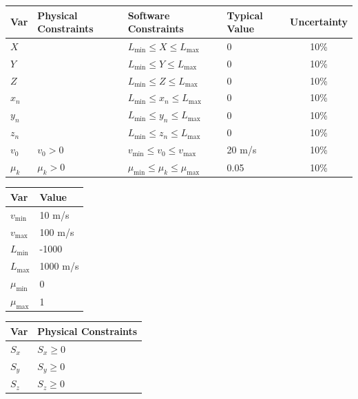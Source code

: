 \documentclass[12pt]{article}
\begin{document}
\begin{table}[!h]
  \caption{Input Variables} \label{TblInputVar}
  \renewcommand{\arraystretch}{1.2}
\noindent \begin{longtable*}{l l l l c} 
  \toprule
  \textbf{Var} & \textbf{Physical Constraints} & \textbf{Software Constraints} &
                             \textbf{Typical Value} & \textbf{Uncertainty}\\
  \midrule 
  $X$ &  & $L_{\text{min}} \leq X \leq L_{\text{max}}$ & 0 & 10\%
  \\
  $Y$ &  & $L_{\text{min}} \leq Y \leq L_{\text{max}}$ & 0 & 10\%
  \\
  $Z$ &  & $L_{\text{min}} \leq Z \leq L_{\text{max}}$ & 0 & 10\%
  \\
  $x_{n}$ &  & $L_{\text{min}} \leq x_{n} \leq L_{\text{max}}$ & 0 & 10\%
  \\
  $y_{n}$ &  & $L_{\text{min}} \leq y_{n} \leq L_{\text{max}}$ & 0 & 10\%
  \\
  $z_{n}$ &  & $L_{\text{min}} \leq z_{n} \leq L_{\text{max}}$ & 0 & 10\%
  \\
  $v_{0}$ & $v_{0} > 0$ & $v_{\text{min}} \leq v_{0} \leq v_{\text{max}}$ & 20 m/s & 10\%
  \\
  $\mu_{k}$ & $\mu_{k} > 0$ & $\mu_{\text{min}} \leq \mu_{k} \leq \mu_{\text{max}}$ & 0.05 & 10\%
  \\
  \bottomrule
\end{longtable*}
\end{table}

\noindent 

\begin{table}[!h]
\caption{Specification Parameter Values} \label{TblSpecParams}
\renewcommand{\arraystretch}{1.2}
\noindent \begin{longtable*}{l l} 
  \toprule
  \textbf{Var} & \textbf{Value} \\
  \midrule 
  $v_\text{min}$ & 10 m/s\\
  $v_\text{max}$ & 100 m/s\\
  $L_\text{min}$ & -1000\\
  $L_\text{max}$ & 1000 m/s\\
  $\mu_\text{min}$ & 0\\
  $\mu_\text{max}$ & 1\\
  \bottomrule
\end{longtable*}
\end{table}

\begin{table}[!h]
\caption{Output Variables} \label{TblOutputVar}
\renewcommand{\arraystretch}{1.2}
\noindent \begin{longtable*}{l l} 
  \toprule
  \textbf{Var} & \textbf{Physical Constraints} \\
  \midrule 
  $S_{x}$ & $S_{x} \geq 0$
  \\
  $S_{y}$ & $S_{y} \geq 0$
  \\
  $S_{z}$ & $S_{z} \geq 0$
  \\
  \bottomrule
\end{longtable*}
\end{table}
\end{document}
